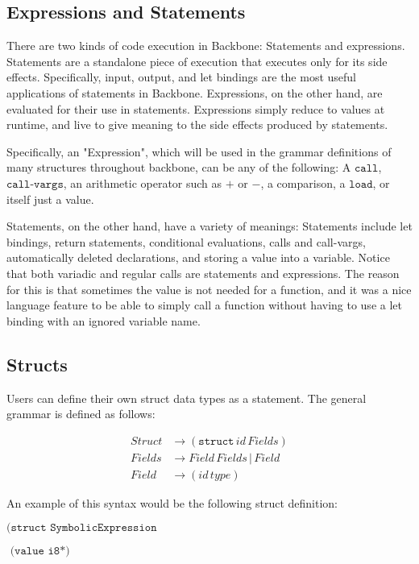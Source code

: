 \documentclass[journal=jacsat, manuscript=article]{achemso}
\begin{document}
\subsection{Expressions and Statements}

There are two kinds of code execution in Backbone: Statements and expressions.
Statements are a standalone piece of execution that executes only for its side effects.
Specifically, input, output, and let bindings are the most useful applications of
statements in Backbone. Expressions, on the other hand, are evaluated for their use in 
statements. Expressions simply reduce to values at runtime, and live to give meaning
to the side effects produced by statements.

Specifically, an "Expression", which will be used in the grammar definitions of
many structures throughout backbone, can be any of the following: A $\texttt{call}$, $\texttt{call-vargs}$, an arithmetic operator such as $+$ or $-$,
a comparison, a $\texttt{load}$, or itself just a value.

Statements, on the other hand, have a variety of meanings: Statements include let bindings,
return statements, conditional evaluations, calls and call-vargs, automatically deleted
declarations, and storing a value into a variable. Notice that both variadic and regular
calls are statements and expressions. The reason for this is that sometimes the value is not
needed for a function, and it was a nice language feature to be able to simply call a function
without having to use a let binding with an ignored variable name.

\subsection{Structs}

Users can define their own struct data types as a statement. The general
grammar is defined as follows:

\begin{align}
Struct &\rightarrow (\texttt{struct}\,id\,Fields) \\
Fields &\rightarrow Field\,Fields\,|\,Field \\
Field  &\rightarrow (id\,type)
\end{align}

An example of this syntax would be the following struct definition:

$\texttt{(struct SymbolicExpression}$

$\texttt{  (value i8*)}$
\end{document}

